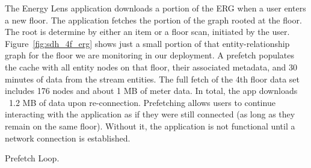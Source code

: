 The Energy Lens application downloads a portion of the ERG when a user enters a new floor.  The application fetches the portion
of the graph rooted at the floor.  The root is determine by either an item or a floor scan, initiated by the user.
Figure~\ref{fig:sdh_4f_erg} shows just a small portion of that entity-relationship graph for the floor we are monitoring in
our deployment.  
A prefetch populates the cache with all entity nodes on that floor, their associated metadata,
and 30 minutes of data from the stream entities.  The full fetch of the 4th floor data set includes
176 nodes and about 1 MB of meter data.  In total, the app downloads ~1.2 MB of data upon re-connection.
Prefetching allows users to continue interacting with the application as if they were still connected (as long as they remain on
the same floor).  Without it, the application is not functional until a network connection is established.


\begin{algorithm}[h!]
 \SetAlgoLined
 \caption{Prefetch Loop.}
 \label{alg:prefetch}
\end{algorithm}


